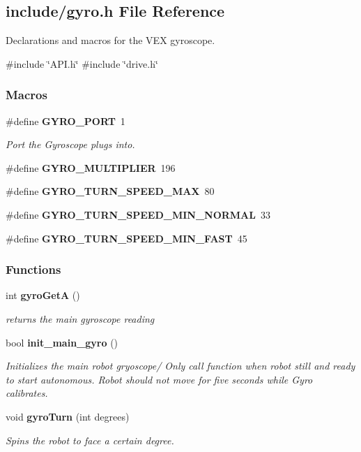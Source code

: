 \subsection{include/gyro.h File Reference}
\label{gyro_8h}


Declarations and macros for the V\+EX gyroscope.  


{\ttfamily \#include \char`\"{}A\+P\+I.\+h\char`\"{}}\newline
{\ttfamily \#include \char`\"{}drive.\+h\char`\"{}}\newline
\subsubsection*{Macros}
\begin{DoxyCompactItemize}
\item 
\#define \textbf{ G\+Y\+R\+O\+\_\+\+P\+O\+RT}~1
\begin{DoxyCompactList}\small\item\em Port the Gyroscope plugs into. \end{DoxyCompactList}\item 
\#define \textbf{ G\+Y\+R\+O\+\_\+\+M\+U\+L\+T\+I\+P\+L\+I\+ER}~196
\item 
\mbox{\label{gyro_8h_a627d2d9cb8e78514db92e9a4d16b73f0}} 
\#define {\bfseries G\+Y\+R\+O\+\_\+\+T\+U\+R\+N\+\_\+\+S\+P\+E\+E\+D\+\_\+\+M\+AX}~80
\item 
\mbox{\label{gyro_8h_a88896fc74b019bfbfd07cf96f3be6298}} 
\#define {\bfseries G\+Y\+R\+O\+\_\+\+T\+U\+R\+N\+\_\+\+S\+P\+E\+E\+D\+\_\+\+M\+I\+N\+\_\+\+N\+O\+R\+M\+AL}~33
\item 
\mbox{\label{gyro_8h_a4c6b61a6f2e9adc5c0eb77ea93c3d4b9}} 
\#define {\bfseries G\+Y\+R\+O\+\_\+\+T\+U\+R\+N\+\_\+\+S\+P\+E\+E\+D\+\_\+\+M\+I\+N\+\_\+\+F\+A\+ST}~45
\end{DoxyCompactItemize}
\subsubsection*{Functions}
\begin{DoxyCompactItemize}
\item 
int \textbf{ gyro\+GetA} ()
\begin{DoxyCompactList}\small\item\em returns the main gyroscope reading \end{DoxyCompactList}\item 
bool \textbf{ init\+\_\+main\+\_\+gyro} ()
\begin{DoxyCompactList}\small\item\em Initializes the main robot gryoscope/ Only call function when robot still and ready to start autonomous. Robot should not move for five seconds while Gyro calibrates. \end{DoxyCompactList}\item 
void \textbf{ gyro\+Turn} (int degrees)
\begin{DoxyCompactList}\small\item\em Spins the robot to face a certain degree. \end{DoxyCompactList}\end{DoxyCompactItemize}


